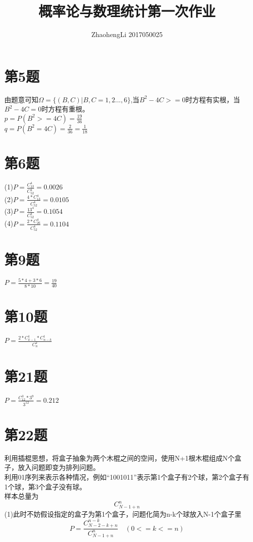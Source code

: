 \documentclass{article}
\title{概率论与数理统计第一次作业}
\author{ZhaohengLi 2017050025}
\begin{document}
\maketitle

\section{第5题}
由题意可知$\Omega=\{(B,C)|B,C=1,2...,6\}$,当$B^{2}-4C>=0$时方程有实根，当$B^{2}-4C=0$时方程有重根。\\
$p=P(B^{2}>=4C)=\frac{19}{36}$\\
$q=P(B^{2}=4C)=\frac{2}{36}=\frac{1}{18}$\\

\section{第6题}
(1)$P=\frac{C^{4}_{13}}{C^{4}_{52}}=0.0026$\\
(2)$P=\frac{4*C^{4}_{13}}{C^{4}_{52}}=0.0105$\\
(3)$P=\frac{13^{4}}{C^{4}_{52}}=0.1054$\\
(4)$P=\frac{2*C^{4}_{26}}{C^{4}_{52}}=0.1104$\\
\section{第9题}
$P=\frac{5*4+3*6}{8*10}=\frac{19}{40}$\\
\section{第10题}
$P=\frac{2*C^{1}_{k-1}*C^{1}_{n-k}}{C^{2}_{n}}$

\section{第21题}
$P=\frac{C^{3}_{12}*3^{9}}{3^{12}}=0.212$


\section{第22题}
利用插棍思想，将盒子抽象为两个木棍之间的空间，使用N+1根木棍组成N个盒子，放入问题即变为排列问题。\\利用01序列来表示各种情况，例如“1001011”表示第1个盒子有2个球，第2个盒子有1个球，第3个盒子没有球。\\
样本总量为
\begin{equation}
    C^{n}_{N-1+n}
\end{equation}
(1)此时不妨假设指定的盒子为第1个盒子，问题化简为n-k个球放入N-1个盒子里\\
\begin{equation}
    P=\frac{C^{n-k}_{N-2-k+n}}{C^{n}_{N-1+n}}\quad(0<=k<=n)
\end{equation}{}
\end{document}
